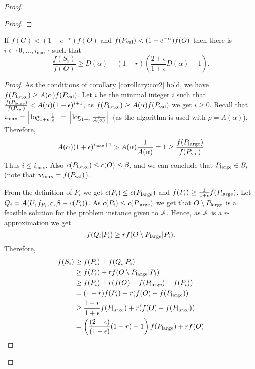 \documentclass[a4paper,UKenglish,cleveref, autoref]{lipics-v2019}
\begin{document}
\begin{proof}
\begin{proof}
			
		\end{proof}

	\begin{corollary}
		\label{corollary:cor3}
			If $f(G)< (1-e^{-\alpha})f(O)$ and $f(P_{\text{val}}) < (1-e^{-\alpha})f(O)$ then
			there is $i\in \{0, \ldots, i_{\max}\}$ such that
		$$\frac{f(S_i)}{f(O)} \geq D(\alpha) + (1-r)\left( \frac{2+\epsilon}{1+\epsilon} D(\alpha) -1 \right).$$
	\end{corollary}
\begin{proof}
		As the conditions of corollary \ref{corollary:cor2} hold, we have
		$f(P_{\text{large}}) \geq A(\alpha) f(P_{\text{val}})$.
		 Let $i$ be the minimal integer $i$ such
		that $\frac{f(P_{\text{large}})}{f(P_{\text{val}})} < A(\alpha)(1+\epsilon) ^{i+1}$, as $f(P_{\text{large}}) \geq A(\alpha) f(P_{\text{val}})$ we get $i\geq 0$.
		Recall that $i_{\max}= \left\lfloor \log_{1+\epsilon} \frac{1}{\rho}  \right\rfloor =
		\left\lfloor \log_{1+\epsilon} \frac{1}{A(\alpha)} \right\rfloor $ (as the algorithm is used
			with $\rho=A(\alpha)$).
			Therefore,
			$$A(\alpha) (1+\epsilon) ^{i_{\max} +1}
			> A(\alpha) \frac{1}{A(\alpha) } = 1 \geq \frac{f(P_{\text{large}})}{f(P_{\text{val}})}$$
			Thus $i\leq i_{\max}$.
			Also $c(P_{\text{large}}) \leq c(O) \leq \beta$, and we can conclude that
			$P_{\text{large}} \in B_i$ (note that $w_{\max} = f(P_{\text{val}})$).
			
			From the definition of $P_i$ we get $c(P_i)\leq c(P_{\text{large}})$ and
			$f(P_i) \geq \frac{1}{1+\epsilon} f(P_{\text{large}})$.
			Let $Q_i  =  \mathcal{A}(U, f_{P_i}, c, \beta - c(P_i))$.
			As $c(P_i) \leq c(P_{\text{large}})$ we get that $O\setminus P_{\text{large}}$
			is a feasible solution for the problem instance given to $\mathcal{A}$.
			Hence, as $\mathcal{A}$ is a $r$-approximation we get
			$$f(Q_i | P_i) \geq r f(O\setminus P_{\text{large}}| P_i).$$
			Therefore,
			\begin{align*}
			f(S_{i})
			&
			\geq f(P_i) + f(Q_i|P_i)
			\\ &
			\geq f(P_i) + r f(O \setminus P_{\text{large}} | P_i)
			\\ &
			\geq f(P_i) + r(f(O) - f(P_{\text{large}}) - f(P_i))
			\\ &
			= (1-r)f(P_i) + r(f(O) - f(P_{\text{large}}))
			\\ &
			\geq \frac{1-r}{1 + \epsilon}f(P_{\text{large}}) + r(f(O) - f(P_{\text{large}}))
			\\ &
			= \left(
			\frac{(2 + \epsilon)}{(1 + \epsilon)}(1-r) - 1
			\right)
			f(P_{\text{large}})
			+ rf(O)
			\end{align*}
			

\end{proof}
\end{proof}
\end{document}
